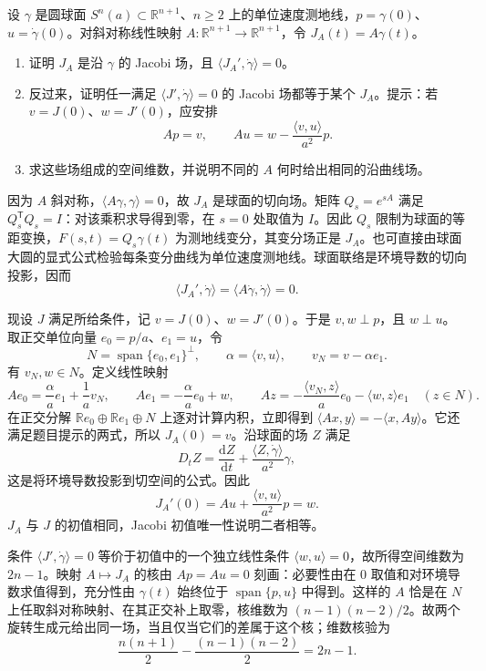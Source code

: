 \begin{exercise}\label{g3:ex:sphere-rotation-jacobi-fields}
	设 \(\gamma\) 是圆球面 \(S^n(a)\subset\mathbb R^{n+1}\)、\(n\ge2\) 上的单位速度测地线，\(p=\gamma(0)\)、\(u=\dot\gamma(0)\)。对斜对称线性映射 \(A:\mathbb R^{n+1}\to\mathbb R^{n+1}\)，令 \(J_A(t)=A\gamma(t)\)。
	\begin{enumerate}
		\item 证明 \(J_A\) 是沿 \(\gamma\) 的 Jacobi 场，且 \(\langle J_A',\dot\gamma\rangle=0\)。
		\item 反过来，证明任一满足 \(\langle J',\dot\gamma\rangle=0\) 的 Jacobi 场都等于某个 \(J_A\)。提示：若 \(v=J(0)\)、\(w=J'(0)\)，应安排
		\[
			Ap=v,\qquad Au=w-\frac{\langle v,u\rangle}{a^2}p.
		\]
		\item 求这些场组成的空间维数，并说明不同的 \(A\) 何时给出相同的沿曲线场。
	\end{enumerate}
\end{exercise}
\begin{solution}
	因为 \(A\) 斜对称，\(\langle A\gamma,\gamma\rangle=0\)，故 \(J_A\) 是球面的切向场。矩阵 \(Q_s=e^{sA}\) 满足 \(Q_s^{\mathsf T}Q_s=I\)：对该乘积求导得到零，在 \(s=0\) 处取值为 \(I\)。因此 \(Q_s\) 限制为球面的等距变换，\(F(s,t)=Q_s\gamma(t)\) 为测地线变分，其变分场正是 \(J_A\)。也可直接由球面大圆的显式公式检验每条变分曲线为单位速度测地线。球面联络是环境导数的切向投影，因而
	\[
		\langle J_A',\dot\gamma\rangle
		=\langle A\dot\gamma,\dot\gamma\rangle=0.
	\]

	现设 \(J\) 满足所给条件，记 \(v=J(0)\)、\(w=J'(0)\)。于是 \(v,w\perp p\)，且 \(w\perp u\)。取正交单位向量 \(e_0=p/a\)、\(e_1=u\)，令
	\[
		N=\operatorname{span}\{e_0,e_1\}^\perp,
		\qquad \alpha=\langle v,u\rangle,
		\qquad v_N=v-\alpha e_1.
	\]
	有 \(v_N,w\in N\)。定义线性映射
	\[
		Ae_0=\frac{\alpha}{a}e_1+\frac1a v_N,
		\qquad Ae_1=-\frac{\alpha}{a}e_0+w,
		\qquad
		Az=-\frac{\langle v_N,z\rangle}{a}e_0-\langle w,z\rangle e_1
		\quad(z\in N).
	\]
	在正交分解 \(\mathbb Re_0\oplus\mathbb Re_1\oplus N\) 上逐对计算内积，立即得到 \(\langle Ax,y\rangle=-\langle x,Ay\rangle\)。它还满足题目提示的两式，所以 \(J_A(0)=v\)。沿球面的场 \(Z\) 满足
	\[
		D_tZ=\frac{\mathrm dZ}{\mathrm dt}
		+\frac{\langle Z,\dot\gamma\rangle}{a^2}\gamma,
	\]
	这是将环境导数投影到切空间的公式。因此
	\[
		J_A'(0)=Au+\frac{\langle v,u\rangle}{a^2}p=w.
	\]
	\(J_A\) 与 \(J\) 的初值相同，Jacobi 初值唯一性说明二者相等。

	条件 \(\langle J',\dot\gamma\rangle=0\) 等价于初值中的一个独立线性条件 \(\langle w,u\rangle=0\)，故所得空间维数为 \(2n-1\)。映射 \(A\mapsto J_A\) 的核由 \(Ap=Au=0\) 刻画：必要性由在 \(0\) 取值和对环境导数求值得到，充分性由 \(\gamma(t)\) 始终位于 \(\operatorname{span}\{p,u\}\) 中得到。这样的 \(A\) 恰是在 \(N\) 上任取斜对称映射、在其正交补上取零，核维数为 \((n-1)(n-2)/2\)。故两个旋转生成元给出同一场，当且仅当它们的差属于这个核；维数核验为
	\[
		\frac{n(n+1)}2-\frac{(n-1)(n-2)}2=2n-1.
	\]
\end{solution}

